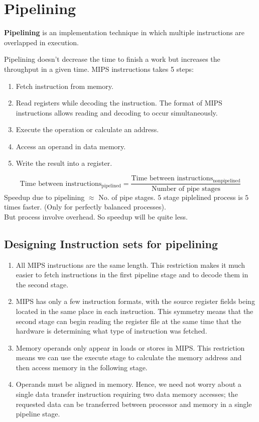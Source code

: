 \documentclass[a4paper,oneside]{book}
\begin{document}
\chapter{Pipelining}
\begin{definition}[Pipelining]
\textbf{Pipelining} is an implementation technique in which multiple instructions are overlapped in execution.
\end{definition}
Pipelining doesn't decrease the time to finish a work but increases the throughput in a given time.
MIPS instrructions takes 5 steps:
\begin{enumerate}
\item Fetch instruction from memory.
\item Read registers while decoding the instruction. The format of MIPS instructions allows reading and decoding to occur simultaneously.
\item  Execute the operation or calculate an address.
\item Access an operand in data memory.
\item Write the result into a register.
\end{enumerate}
$$ \text{Time between instructions}_{\text{pipelined}} = \dfrac{\text{Time between instructions}_{\text{nonpipelined}}}{\text{Number of pipe stages}}$$
Speedup due to pipelining $\approx$ No. of pipe stages. $5$ stage piplelined process is $5$ times faster. (Only for perfectly balanced processes).\\
But process involve overhead. So speedup will be quite less.
\section{Designing Instruction sets for pipelining}
\begin{enumerate}
\item All MIPS instructions are the same length. This restriction makes it much easier to fetch instructions in the first pipeline stage and to decode them in the second stage.
\item MIPS has only a few instruction formats, with the source register fields being located in the same place in each instruction. This symmetry means that the second stage can begin reading the register file at the same time that the hardware is determining what type of instruction was fetched. 
\item Memory operands only appear in loads or stores in MIPS. This restriction means we can use the execute stage to calculate the memory address and then access memory in the following stage.
\item Operands must be aligned in memory. Hence, we need not worry about a single data transfer instruction requiring two data memory accesses; the requested data can be transferred between processor and memory in a single pipeline stage.
\end{enumerate}
\end{document}
